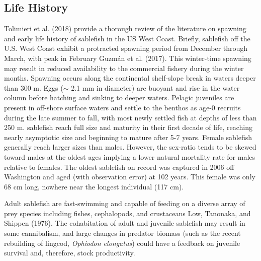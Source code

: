 \documentclass[11pt,
  english,
  a4paper,
]{article}
\begin{document}
\leavevmode\tagmcend\tagstructend\par


\hypertarget{life-history}{%
\subsection{Life History}\label{life-history}}

\leavevmode\tagmcend\tagstructend


{Tolimieri et al. (2018)\leavevmode\tagmcend\tagstructend} provide a thorough review of the literature on spawning and early life history of sablefish in the US West Coast. Briefly, sablefish off the U.S. West Coast exhibit a protracted spawning period from December through March, with peak in February {Guzmán et al. (2017)\leavevmode\tagmcend\tagstructend}. This winter-time spawning may result in reduced availability to the commercial fishery during the winter months. Spawning occurs along the continental shelf-slope break in waters deeper than 300 m. Eggs ({\(\sim\)\leavevmode\tagmcend\tagstructend} 2.1 mm in diameter) are buoyant and rise in the water column before hatching and sinking to deeper waters. Pelagic juveniles are present in off-shore surface waters and settle to the benthos as age-0 recruits during the late summer to fall, with most newly settled fish at depths of less than 250 m. sablefish reach full size and maturity in their first decade of life, reaching nearly asymptotic size and beginning to mature after 5-7 years. Female sablefish generally reach larger sizes than males. However, the sex-ratio tends to be skewed toward males at the oldest ages implying a lower natural mortality rate for males relative to females. The oldest sablefish on record was captured in 2006 off Washington and aged (with observation error) at 102 years. This female was only 68 cm long, nowhere near the longest individual (117 cm).

\leavevmode\tagmcend\tagstructend\par


Adult sablefish are fast-swimming and capable of feeding on a diverse array of prey species including fishes, cephalopods, and crustaceans {Low, Tanonaka, and Shippen (1976)\leavevmode\tagmcend\tagstructend}. The cohabitation of adult and juvenile sablefish may result in some cannibalism, and large changes in predator biomass (such as the recent rebuilding of lingcod, \emph{Ophiodon elongatus}) could have a feedback on juvenile survival and, therefore, stock productivity.
\end{document}
